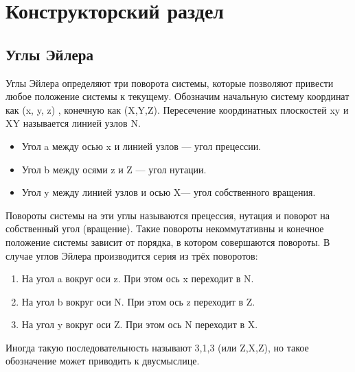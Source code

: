 \chapter{Конструкторский раздел}


\section{Углы Эйлера}
\hspace{0.6cm}Углы Эйлера определяют три поворота системы, которые позволяют привести любое положение системы к текущему. Обозначим начальную систему координат как (x, y, z) , конечную как (X,Y,Z). Пересечение координатных плоскостей xy и XY называется линией узлов N.
\begin{itemize}
	\item Угол a между осью x и линией узлов — угол прецессии.
	\item Угол b между осями z и Z — угол нутации.
	\item Угол y между линией узлов и осью  X— угол собственного вращения.
\end{itemize}

\hspace{0.6cm}Повороты системы на эти углы называются прецессия, нутация и поворот на собственный угол (вращение). Такие повороты некоммутативны и конечное положение системы зависит от порядка, в котором совершаются повороты. В случае углов Эйлера производится серия из трёх поворотов:
\begin{enumerate}
	\item На угол a вокруг оси z. При этом ось x переходит в N.
	\item На угол b вокруг оси N. При этом ось z переходит в Z.
	\item 	На угол y вокруг оси Z. При этом ось N переходит в X.
\end{enumerate}
Иногда такую последовательность называют 3,1,3 (или Z,X,Z), но такое обозначение может приводить к двусмыслице.


